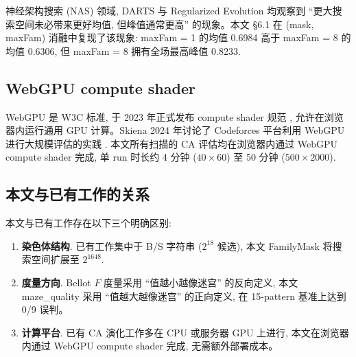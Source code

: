 神经架构搜索 (NAS) 领域, DARTS \cite{liu2018darts} 与 Regularized Evolution \cite{real2019regularized} 均观察到 ``更大搜索空间未必带来更好均值, 但峰值通常更高'' 的现象。本文 §6.1 在 (mask, maxFam) 消融中复现了该现象: maxFam = 1 的均值 0.6984 高于 maxFam = 8 的均值 0.6306, 但 maxFam = 8 拥有全场最高峰值 0.8233.

\subsection{WebGPU compute shader}

WebGPU 是 W3C 标准, 于 2023 年正式发布 compute shader 规范 \cite{webgpu2023}, 允许在浏览器内运行通用 GPU 计算。Skiena 2024 年讨论了 Codeforces 平台利用 WebGPU 进行大规模评估的实践 \cite{skiena2024}. 本文所有扫描的 CA 评估均在浏览器内通过 WebGPU compute shader 完成, 单 run 时长约 4 分钟 ($40 \times 60$) 至 50 分钟 ($500 \times 2000$).

\subsection{本文与已有工作的关系}

本文与已有工作存在以下三个明确区别:
\begin{enumerate}[leftmargin=*, itemsep=0pt, topsep=0pt]
  \item \textbf{染色体结构}. 已有工作集中于 B/S 字符串 ($2^{18}$ 候选), 本文 FamilyMask 将搜索空间扩展至 $2^{1648}$.
  \item \textbf{度量方向}. Bellot $F$ 度量采用 ``值越小越像迷宫'' 的反向定义, 本文 maze\_quality 采用 ``值越大越像迷宫'' 的正向定义, 在 15-pattern 基准上达到 0/9 误判。
  \item \textbf{计算平台}. 已有 CA 演化工作多在 CPU 或服务器 GPU 上进行, 本文在浏览器内通过 WebGPU compute shader 完成, 无需额外部署成本。
\end{enumerate}
